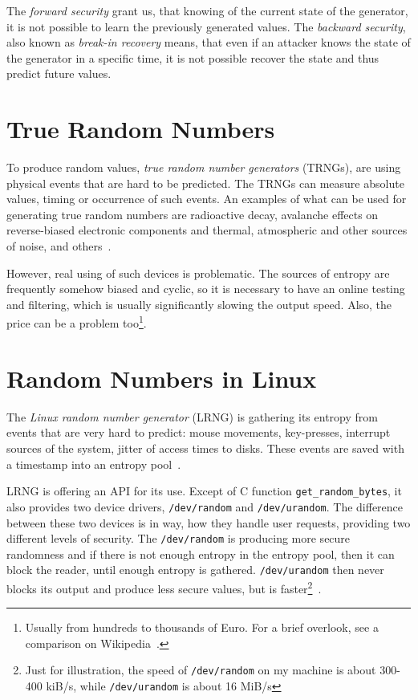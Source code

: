 \par{
The {\em forward security} grant us, that knowing of the current state 
of the generator, it is not possible to learn the previously generated values. 
The {\em backward security}, also known as {\em break-in recovery}  means, 
that even if an attacker knows the state of the generator in a specific time, 
it is not possible recover the state and thus predict future values.
}
\section{True Random Numbers}
\par{
To produce random values, {\em true random number generators} (TRNGs), 
are using physical events that are hard to be predicted. The TRNGs 
can measure absolute values, timing or occurrence of such events.
An examples of what can be used for generating true random numbers 
are radioactive decay, avalanche effects on reverse-biased electronic 
components and thermal, atmospheric and other sources of noise, 
and others~\cite[p.~6]{AnalysisOfEntropyLevels}.
}

\par{
However, real using of such devices is problematic. The sources of entropy are 
frequently somehow biased and cyclic, so it is necessary to have an online 
testing and filtering, which is usually significantly slowing the output speed. 
Also, the price can be a problem too\footnote{Usually from hundreds 
to thousands of Euro. For a brief overlook, see a comparison 
on Wikipedia~\cite{HWRNGComparison}.}.
}

\section{Random Numbers in Linux}\label{sec:randomNumbers:linux}
\par{
The {\em Linux random number generator} (LRNG) is gathering its entropy 
from events that are very hard to predict: mouse movements, key-presses, 
interrupt sources of the system, jitter of access times to disks. 
These events are saved with a timestamp into an entropy 
pool~\cite{AnalysisOfLinuxRNG}.
}

\par{
LRNG is offering an API for its use. Except of C function 
{\tt get\_random\_bytes}, it also provides two device drivers, {\tt /dev/random} 
and {\tt /dev/urandom}. The difference between these two devices is in way, 
how they handle user requests, providing two different levels of security. 
The {\tt /dev/random} is producing more secure randomness and if there 
is not enough entropy in the entropy pool, then it can block the reader, 
until enough entropy is gathered. {\tt /dev/urandom} then never blocks its output
 and produce less secure values, but is faster\footnote{Just for illustration, 
 the speed of {\tt /dev/random} on my machine is about 300-400 kiB/s, 
 while {\tt /dev/urandom} is about 16 MiB/s}~\cite[chapter~1]{AnalysisOfLinuxRNG}. 
}


